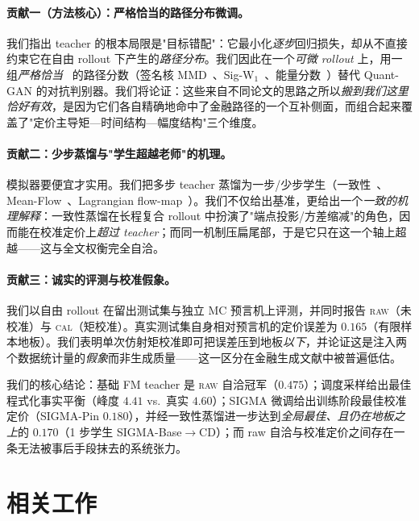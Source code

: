 \documentclass[11pt]{ctexart}
\newcommand{\raw}{\textsc{raw}}
\renewcommand{\cal}{\textsc{cal}}
\begin{document}
\paragraph{贡献一（方法核心）：严格恰当的路径分布微调。}
我们指出 teacher 的根本局限是"目标错配"：它最小化\emph{逐步}回归损失，却从不直接约束它在自由 rollout 下产生的\emph{路径分布}。我们因此在一个\emph{可微 rollout} 上，用一组\emph{严格恰当}~\citep{gneiting2007strictly} 的路径分数（签名核 MMD~\citep{salvi2021signature,issa2023nonadversarial,gretton2012kernel}、Sig-W$_1$~\citep{ni2021sigwgan,ni2020conditional}、能量分数~\citep{pacchiardi2024probabilistic}）替代 Quant-GAN 的对抗判别器。我们将论证：这些来自不同论文的思路之所以\emph{搬到我们这里恰好有效}，是因为它们各自精确地命中了金融路径的一个互补侧面，而组合起来覆盖了"定价主导矩—时间结构—幅度结构"三个维度。

\paragraph{贡献二：少步蒸馏与"学生超越老师"的机理。}
模拟器要便宜才实用。我们把多步 teacher 蒸馏为一步/少步学生（一致性~\citep{song2023consistency,song2024improved}、Mean-Flow~\citep{geng2025meanflow}、Lagrangian flow-map~\citep{boffi2025flowmaps}）。我们不仅给出基准，更给出一个\emph{一致的机理解释}：一致性蒸馏在长程复合 rollout 中扮演了"端点投影/方差缩减"的角色，因而能在校准定价上\emph{超过 teacher}；而同一机制压扁尾部，于是它只在这一个轴上超越——这与全文权衡完全自洽。

\paragraph{贡献三：诚实的评测与校准假象。}
我们以自由 rollout 在留出测试集与独立 MC 预言机上评测，并同时报告 \raw{}（未校准）与 \cal{}（矩校准）。真实测试集自身相对预言机的定价误差为 $0.165$（有限样本地板）。我们表明单次仿射矩校准即可把误差压到地板\emph{以下}，并论证这是注入两个数据统计量的\emph{假象}而非生成质量——这一区分在金融生成文献中被普遍低估。

我们的核心结论：基础 FM teacher 是 \raw{} 自洽冠军（$0.475$）；调度采样给出最佳程式化事实平衡（峰度 $4.41$ vs.\ 真实 $4.60$）；SIGMA 微调给出训练阶段最佳校准定价（SIGMA-Pin $0.180$），并经一致性蒸馏进一步达到\emph{全局最佳、且仍在地板之上}的 $0.170$（1 步学生 SIGMA-Base$\to$CD）；而 raw 自洽与校准定价之间存在一条无法被事后手段抹去的系统张力。

\section{相关工作}
\label{sec:related}
\end{document}
